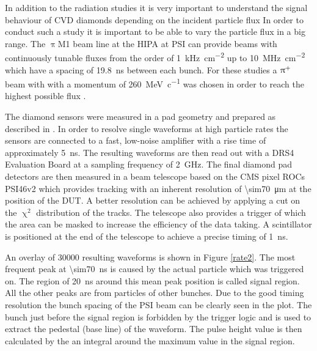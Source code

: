 In addition to the radiation studies it is very important to understand the signal behaviour of \ac{CVD} diamonds depending on the incident particle flux
In order to conduct such a study it is important to be able to vary the particle flux in a big range. The $\uppi$M1 beam line at the \ac{HIPA} at \ac{PSI} can provide beams with continuously tunable fluxes from the order of \SI{1}{\kilo\hertz\per\centi\meter^2} up to \SI{10}{\mega\hertz\per\centi\meter^2} which have a spacing of \SI{19.8}{\nano\second} between each bunch. For these studies a $\uppi^{\text{+}}$ beam with with a momentum of \SI{260}{\mega\electronvolt\per c}  was chosen in order to reach the highest possible flux \cite{pim1}.\par
The diamond sensors were measured in a pad geometry and prepared as described in \cite{rainer}. 
In order to resolve single waveforms at high particle rates the sensors are connected to a fast, low-noise amplifier with a rise time of approximately \SI{5}{\nano\second}. The resulting waveforms are then read out with a DRS4 Evaluation Board at a sampling frequency of \SI{2}{\giga\hertz}. The final diamond pad detectors are then measured in a beam telescope based on the CMS pixel \acp{ROC} PSI46v2 \cite{kornmayer} which provides tracking with an inherent resolution of \SI{\sim70}{\micro\meter}  at the position of the DUT. A better resolution can be achieved by applying a cut on the $\upchi^{2}$ distribution of the tracks. The telescope also provides a trigger of which the area can be masked to increase the efficiency of the data taking. A scintillator is positioned at the end of the telescope to achieve a precise timing of \SI{1}{\nano\second}.\par
An overlay of 30000 resulting waveforms is shown in Figure \vref{rate2}. The most frequent peak at \SI{\sim70}{\nano\second} is caused by the actual particle which was triggered on. The region of \SI{20}{\nano\second} around this mean peak position is called signal region. All the other peaks are from particles of other bunches. Due to the good timing resolution the bunch spacing of the \ac{PSI} beam can be clearly seen in the plot. The bunch just before the signal region is forbidden by the trigger logic and is used to extract the pedestal (base line) of the waveform. The pulse height value is then calculated by the an integral around the maximum value in the signal region.\par

